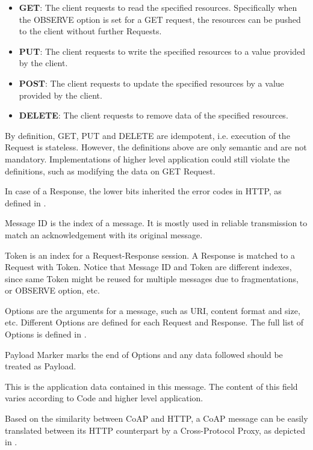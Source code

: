 \begin{description}[style=nextline]
\begin{itemize}
		\item \textbf{GET}: The client requests to read the specified resources. Specifically when the OBSERVE option is set for a GET request, the resources can be pushed to the client  without further Requests\cite{rfc7641}.
		\item \textbf{PUT}: The client requests to write the specified resources to a value provided by the client.
		\item \textbf{POST}: The client requests to update the specified resources by a value provided by the client.
		\item \textbf{DELETE}: The client requests to remove data of the specified resources.
	\end{itemize}
	By definition, GET, PUT and DELETE are idempotent, i.e. execution of the Request is stateless. However, the definitions above are only semantic and are not mandatory. Implementations of higher level application could still violate the definitions, such as modifying the data on GET Request.
	
	In case of a Response, the lower bits inherited the error codes in HTTP, as defined in \cite{rfc2616}.
	\item[\textbf{Message ID}]
	Message ID is the index of a message. It is mostly used in reliable transmission to match an acknowledgement with its original message.
	\item[\textbf{Token}]
	Token is an index for a Request-Response session. A Response is matched to a Request with Token. Notice that Message ID and Token are different indexes, since same Token might be reused for multiple messages due to fragmentations, or OBSERVE option, etc.
	\item[\textbf{Options}]
	Options are the arguments for a message, such as URI, content format and size, etc. Different Options are defined for each Request and Response. The full list of Options is defined in \cite{rfc7252}.
	\item[\textbf{Payload Mark}]
	Payload Marker marks the end of Options and any data followed should be treated as Payload.
	\item[\textbf{Payload}]
	This is the application data contained in this message. The content of this field varies according to Code and higher level application.
\end{description}

Based on the similarity between CoAP and HTTP, a CoAP message can be easily translated between its HTTP counterpart by a Cross-Protocol Proxy, as depicted in \cite{rfc7252}.


